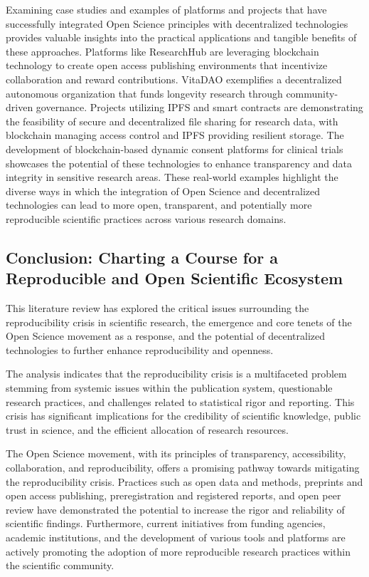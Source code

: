 Examining case studies and examples of platforms and projects that have successfully integrated Open Science principles with decentralized technologies provides valuable insights into the practical applications and tangible benefits of these approaches. Platforms like ResearchHub are leveraging blockchain technology to create open access publishing environments that incentivize collaboration and reward contributions. VitaDAO exemplifies a decentralized autonomous organization that funds longevity research through community-driven governance. Projects utilizing IPFS and smart contracts are demonstrating the feasibility of secure and decentralized file sharing for research data, with blockchain managing access control and IPFS providing resilient storage. The development of blockchain-based dynamic consent platforms for clinical trials showcases the potential of these technologies to enhance transparency and data integrity in sensitive research areas. These real-world examples highlight the diverse ways in which the integration of Open Science and decentralized technologies can lead to more open, transparent, and potentially more reproducible scientific practices across various research domains.

\subsection{Conclusion: Charting a Course for a Reproducible and Open Scientific Ecosystem}

This literature review has explored the critical issues surrounding the reproducibility crisis in scientific research, the emergence and core tenets of the Open Science movement as a response, and the potential of decentralized technologies to further enhance reproducibility and openness.

The analysis indicates that the reproducibility crisis is a multifaceted problem stemming from systemic issues within the publication system, questionable research practices, and challenges related to statistical rigor and reporting. This crisis has significant implications for the credibility of scientific knowledge, public trust in science, and the efficient allocation of research resources.

The Open Science movement, with its principles of transparency, accessibility, collaboration, and reproducibility, offers a promising pathway towards mitigating the reproducibility crisis. Practices such as open data and methods, preprints and open access publishing, preregistration and registered reports, and open peer review have demonstrated the potential to increase the rigor and reliability of scientific findings. Furthermore, current initiatives from funding agencies, academic institutions, and the development of various tools and platforms are actively promoting the adoption of more reproducible research practices within the scientific community.

